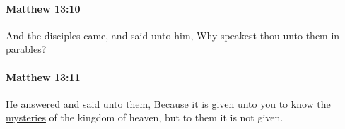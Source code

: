 		\paragraph{Matthew 13:10} %
			\label{MATTHEW-13-10}

			And the disciples came, and said unto him, Why speakest thou unto them in parables?

			\begin{framed}
			\scriptsize
				\begin{compactdesc}
					\item[SBLG] 
				\end{compactdesc}
			\end{framed}

		\paragraph{Matthew 13:11} %
			\label{MATTHEW-13-11}

			He answered and said unto them, Because it is given unto you to know the \hyperref[MYSTERY]{mysteries} of the kingdom of heaven, but to them it is not given.

